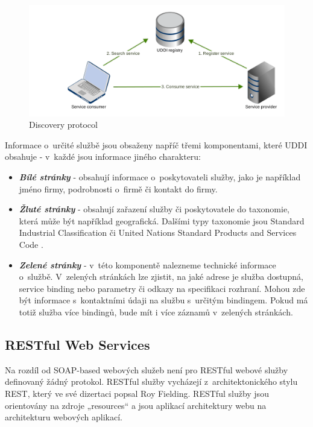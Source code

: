 \documentclass[11pt,twoside,a4paper]{book}
\begin{document}
\begin{figure}[h]
\begin{center}
\includegraphics[width=13cm]{images-pdf/uddi.pdf} 
\caption{Discovery protocol}
\label{fig:uddi}
\end{center}
\end{figure}

Informace o~určité službě jsou obsaženy napříč třemi komponentami, které UDDI obsahuje -
v~každé jsou informace jiného charakteru:

\begin{itemize}
  \item \textbf{\textit{Bílé stránky}} - obsahují informace
o~poskytovateli služby, jako je například jméno firmy, podrobnosti o~firmě či kontakt do firmy.

  \item \textbf{\textit{Žluté stránky}} - obsahují zařazení služby
  či poskytovatele do taxonomie, která může být například geografická. Dalšími typy taxonomie jsou Standard Industrial
Classification  \cite{SIC} či United Nations Standard Products and Services
Code  \cite{UNSPSC}.

  \item \textbf{\textit{Zelené stránky}} - v~této komponentě nalezneme technické
  informace o~službě. V~zelených stránkách lze zjistit, na jaké adrese je služba
  dostupná, service binding nebo
parametry či odkazy na specifikaci rozhraní. Mohou zde být informace
s~kontaktními údaji na službu s~určitým bindingem. Pokud má totiž služba více
bindingů, bude mít i více záznamů v~zelených stránkách.

\end{itemize}

\subsection{RESTful Web Services}

Na rozdíl od SOAP-based webových služeb není pro RESTful webové služby
definovaný žádný protokol. RESTful služby vycházejí z~architektonického stylu
REST, který ve své dizertaci \cite{Fielding00} popsal Roy Fielding. RESTful
služby jsou orientovány na zdroje „resources“ a jsou aplikací architektury webu
na architekturu webových aplikací.
\end{document}
